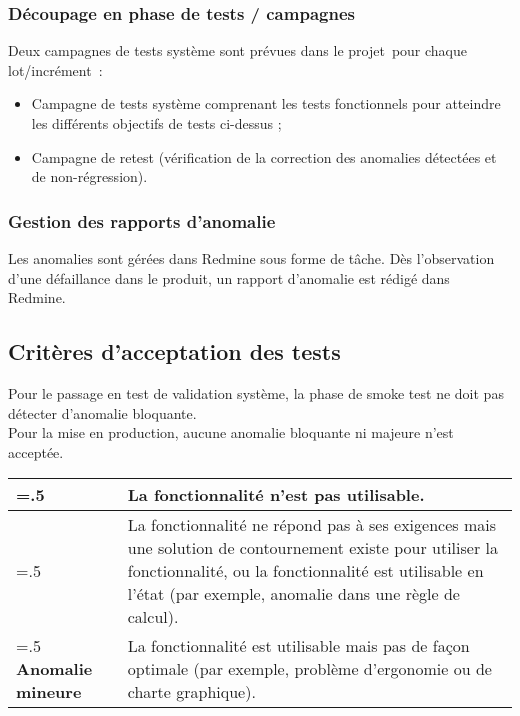 \subsubsection{Découpage en phase de tests / campagnes}
\label{sec:process:orga:decoupage}
Deux campagnes de tests système sont prévues dans le projet pour chaque lot/incrément~:
\begin{itemize}
    \item Campagne de tests système comprenant les tests fonctionnels pour atteindre les différents objectifs de tests ci-dessus ;
    \item Campagne de retest (vérification de la correction des anomalies détectées et de non-régression).
\end{itemize}

\subsubsection{Gestion des rapports d’anomalie}
\label{sec:process:orga:anomalies}

Les anomalies sont gérées dans Redmine sous forme de tâche.
Dès l’observation d’une défaillance dans le produit, un rapport d’anomalie est rédigé dans Redmine.

\subsection{Critères d’acceptation des tests}
\label{sec:process:accept}

Pour le passage en test de validation système, la phase de smoke test ne doit pas détecter d’anomalie bloquante.\\

Pour la mise en production, aucune anomalie bloquante ni majeure n’est acceptée.

\begin{table}[H]
    \centering
    \begin{tabularx}{\textwidth}{|>{\hsize=.5\hsize}X|>{\hsize=1.5\hsize}X|}
        \hline
        {\bf Anomalie bloquante} & La fonctionnalité n’est pas utilisable. \\
        \hline
        {\bf Anomalie majeure} & La fonctionnalité ne répond pas à ses exigences mais une solution de contournement existe pour utiliser la fonctionnalité, ou la fonctionnalité est utilisable en l’état (par exemple, anomalie dans une règle de calcul). \\
        \hline
        {\bf Anomalie mineure} & La fonctionnalité est utilisable mais pas de façon optimale (par exemple, problème d’ergonomie ou de charte graphique). \\
        \hline
    \end{tabularx}
\end{table}
  

